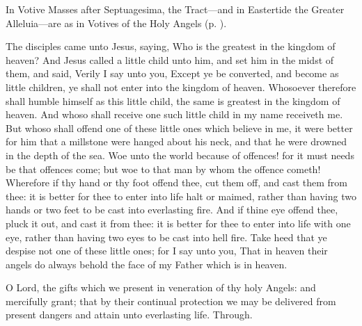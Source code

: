 
\begin{rubric}
	In Votive Masses after Septuagesima, the Tract---and in Eastertide the Greater Alleluia---are as in Votives of the Holy Angels (p. \pageref{MassOfTheAngels}).
\end{rubric}

 The disciples came unto Jesus, saying, Who is the greatest in the kingdom of heaven? And Jesus called a little child unto him, and set him in the midst of them, and said, Verily I say unto you, Except ye be converted, and become as little children, ye shall not enter into the kingdom of heaven. Whosoever therefore shall humble himself as this little child, the same is greatest in the kingdom of heaven. And whoso shall receive one such little child in my name receiveth me. But whoso shall offend one of these little ones which believe in me, it were better for him that a millstone were hanged about his neck, and that he were drowned in the depth of the sea. Woe unto the world because of offences! for it must needs be that offences come; but woe to that man by whom the offence cometh! Wherefore if thy hand or thy foot offend thee, cut them off, and cast them from thee: it is better for thee to enter into life halt or maimed, rather than having two hands or two feet to be cast into everlasting fire. And if thine eye offend thee, pluck it out, and cast it from thee: it is better for thee to enter into life with one eye, rather than having two eyes to be cast into hell fire. Take heed that ye despise not one of these little ones; for I say unto you, That in heaven their angels do always behold the face of my Father which is in heaven.


\vspace{-1ex}

\secret
{} O Lord, the gifts which we present in veneration of thy holy Angels: and mercifully grant; that by their continual protection we may be delivered from present dangers and attain unto everlasting life. Through.


